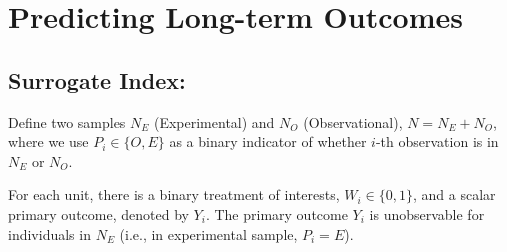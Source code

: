 \chapter{Predicting Long-term Outcomes}
\section{Surrogate Index: \cite{athey2019surrogate}}
Define two samples $N_E$ (Experimental) and $N_O$ (Observational), $N=N_E+N_O$, where we use $P_i\in\{O,E\}$ as a binary indicator of whether $i$-th observation is in $N_E$ or $N_O$.

For each unit, there is a binary treatment of interests, $W_i\in\{0,1\}$, and a scalar primary outcome, denoted by $Y_i$. The primary outcome $Y_i$ is unobservable for individuals in $N_E$ (i.e., in experimental sample, $P_i=E$).